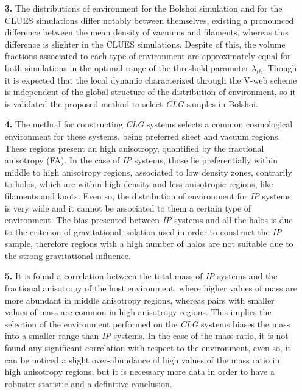 \begin{enumerate}
\item[\textbf{3.}] The distributions of environment for the Bolshoi 
simulation and for the CLUES simulations differ notably between themselves,
existing a pronounced difference between the mean density of vacuums and
filaments, whereas this difference is slighter in the CLUES simulations.
Despite of this, the volume fractions associated to each type of 
environment are approximately equal for both simulations in the optimal
range of the threshold parameter $\lambda_{th}$. Though it is expected
that the local dynamic characterized through the V-web scheme is 
independent of the global structure of the distribution of environment, 
so it is validated the proposed method to select \textit{CLG} samples in
Bolshoi.


\item[\textbf{4.}] The method for constructing \textit{CLG} systems 
selects a common cosmological environment for these systems, being 
preferred sheet and vacuum regions. These regions present an high 
anisotropy, quantified by the fractional anisotropy (FA). In the case of
\textit{IP} systems, those lie preferentially within middle to high
anisotropy regions, associated to low density zones, contrarily to halos, 
which are within high density and less anisotropic regions, like filaments 
and knots. Even so, the distribution of environment for \textit{IP} systems 
is very wide and it cannot be associated to them a certain type of 
environment. The bias presented between \textit{IP} systems and all the
halos is due to the criterion of gravitational isolation used in order to
construct the \textit{IP} sample, therefore regions with a high number 
of halos are not suitable due to the strong gravitational influence.


\item[\textbf{5.}] It is found a correlation between the total mass of
\textit{IP} systems and the fractional anisotropy of the host environment,
where higher values of mass are more abundant in middle anisotropy regions,
whereas pairs with smaller values of mass are common in high anisotropy
regions. This implies the selection of the environment performed on the
\textit{CLG} systems biases the mass into a smaller range than \textit{IP}
systems. In the case of the mass ratio, it is not found any significant 
correlation with respect to the environment, even so, it can be noticed a
slight over-abundance of high values of the mass ratio in high anisotropy
regions, but it is necessary more data in order to have a robuster 
statistic and a definitive conclusion.



\end{enumerate}
